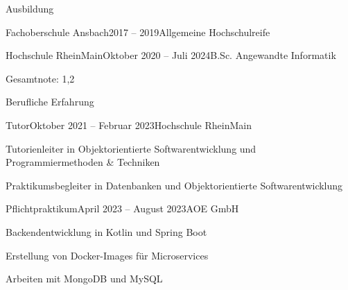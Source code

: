 \documentclass{resume}
\begin{document}
\maketitle

\begin{cvsection}{Ausbildung}
  \begin{cvsubsection}{Fachoberschule Ansbach}{2017 -- 2019}{Allgemeine Hochschulreife}
  \end{cvsubsection}
  \begin{cvsubsection}{Hochschule RheinMain}{Oktober 2020 -- Juli 2024}{B.Sc. Angewandte Informatik}
	\item Gesamtnote: 1,2
  \end{cvsubsection}
\end{cvsection}


\begin{cvsection}{Berufliche Erfahrung}
  \begin{cvsubsection}{Tutor}{Oktober 2021 -- Februar 2023}{Hochschule RheinMain}
      \item Tutorienleiter in Objektorientierte Softwarentwicklung und Programmiermethoden \& Techniken
      \item Praktikumsbegleiter in Datenbanken und Objektorientierte Softwarentwicklung
  \end{cvsubsection}
  \begin{cvsubsection}{Pflichtpraktikum}{April 2023 -- August 2023}{AOE GmbH}
      \item Backendentwicklung in Kotlin und Spring Boot
      \item Erstellung von Docker-Images f\"ur Microservices
      \item Arbeiten mit MongoDB und MySQL
  \end{cvsubsection}
\end{cvsection}
\end{document}
